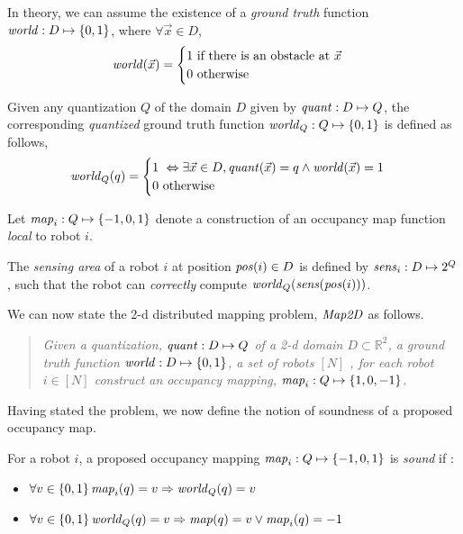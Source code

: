 In theory, we can assume the existence of a \emph{ground truth} function $\mathit{world} : D\mapsto \left\{0,1\right\}$, where $\forall \Vec{x} \in D$, $$\mathit{world}(\Vec{x}) = \begin{cases}
1\ \mbox{if there is an obstacle at }\Vec{x}\\
0\ \mbox{otherwise}
\end{cases}
$$

Given any quantization $Q$ of the domain $D$ given by $\mathit{quant}:D\mapsto Q$, the corresponding \emph{quantized} ground truth function 
$\mathit{world}_Q : Q \mapsto \left\{0,1\right\}$ is defined as follows,  $$\mathit{world}_Q(q) = \begin{cases}
1\ \Leftrightarrow \exists \Vec{x}\in D, \mathit{quant}(\Vec{x}) = q \wedge \mathit{world}(\Vec{x}) = 1 \\
0\ \mbox{otherwise}
\end{cases}
$$

Let $\mathit{map}_i:Q\mapsto \left\{-1,0,1\right\}$ denote a construction of an occupancy map function \emph{local} to robot $i$.  %

\begin{definition} The \emph{sensing area} of a robot $i$ at position $\mathit{pos}(i)\in D$ is defined by $\mathit{sens}_i: D \mapsto 2^{Q}$, such that the robot can \emph{correctly} compute $\mathit{world}_Q(\mathit{sens}(\mathit{pos}(i)))$.
  \end{definition}
 
We can now state the 2-d distributed mapping problem, $\mathit{Map2D}$ as follows. \begin{quote}
 {\em Given a quantization, $\mathit{quant}:D\mapsto Q$ of a 2-d domain $D\subset \mathbb{R}^2$, a ground truth function $\mathit{world}:D \mapsto \left\{0,1\right\}$, a set of robots $[N]$ , for each robot $i \in [N]$ construct an occupancy mapping, $\mathit{map}_i: Q \mapsto \left\{1,0,-1\right\}$.
 }
\end{quote}


 Having stated the problem, we now define the notion of soundness of a proposed occupancy map. 
\begin{definition}
\label{soundness}
 For a robot $i$, a proposed occupancy mapping $\mathit{map}_i: Q \mapsto \left\{-1,0,1\right\}$ is \emph{sound} if :
\begin{itemize}
\item $\forall v \in \left\{0,1\right\} \mathit{map}_i(q) = v \Rightarrow \mathit{world}_Q(q)  = v$
\item $\forall v \in \left\{0,1\right\}\mathit{world}_Q(q) = v \Rightarrow \mathit{map}(q) = v \vee \mathit{map}_i(q) = -1$
\end{itemize}
\end{definition}


